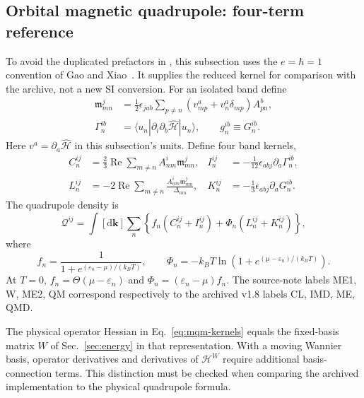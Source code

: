 \documentclass[prx,amsmath,amssymb,superscriptaddress,longbibliography]{revtex4-2}
\newcommand{\Rea}{\operatorname{Re}}
\newcommand{\dd}{\mathrm{d}}
\newcommand{\code}[1]{\texttt{\detokenize{#1}}}
\begin{document}
\subsection{Orbital magnetic quadrupole: four-term reference}
\label{sec:mqm}
To avoid the duplicated prefactors in \code{Wannier.tex}, this subsection
uses the $e=\hbar=1$ convention of Gao and Xiao~\cite{GaoXiao2018}.
It supplies the reduced kernel for comparison with the archive, not a new SI conversion.
For an isolated band define
\begin{align}
 \mathfrak m_{mn}^{j}
 &=\frac12\epsilon_{jab}\sum_{p\ne n}
       (v_{mp}^a+v_n^a\delta_{mp})A_{pn}^b,\label{eq:interband-moment}\\
 \Gamma_n^{i b}&=\langle u_n|\partial_i\partial_b\hat{\mathcal H}|u_n\rangle,
 \qquad g_n^{ib}\equiv G_n^{ib}.
\end{align}
Here $v^a=\partial_a\hat{\mathcal H}$ in this subsection's units.
Define four band kernels,
\begin{align}
 C_n^{ij}&=\frac23\Rea\sum_{m\ne n}A_{nm}^i\mathfrak m_{mn}^j,
 &I_n^{ij}&=-\frac1{12}\epsilon_{abj}\partial_a\Gamma_n^{ib},
 \nonumber\\
 L_n^{ij}&=-2\Rea\sum_{m\ne n}
                 \frac{A_{nm}^i\mathfrak m_{mn}^j}{\Delta_{nm}},
 &K_n^{ij}&=-\frac13\epsilon_{abj}\partial_aG_n^{ib}.
 \label{eq:mqm-kernels}
\end{align}
The quadrupole density is
\begin{equation}
 \mathcal Q^{ij}=\int[\dd\bm k]\sum_n
 \left\{f_n(C_n^{ij}+I_n^{ij})+\Phi_n(L_n^{ij}+K_n^{ij})\right\},
 \label{eq:mqm}
\end{equation}
where
\begin{equation}
 f_n=\frac1{1+e^{(\varepsilon_n-\mu)/(k_BT)}},\qquad
 \Phi_n=-k_BT\ln\left(1+e^{(\mu-\varepsilon_n)/(k_BT)}\right).
 \label{eq:grand-potential}
\end{equation}
At $T=0$, $f_n=\Theta(\mu-\varepsilon_n)$ and
$\Phi_n=(\varepsilon_n-\mu)f_n$.
The source-note labels ME1, W, ME2, QM correspond respectively to the
archived v1.8 labels CL, IMD, ME, QMD.

The physical operator Hessian in Eq.~\eqref{eq:mqm-kernels} equals the fixed-basis
matrix $W$ of Sec.~\ref{sec:energy} in that representation.
With a moving Wannier basis, operator derivatives and derivatives of
$\mathcal H^W$ require additional basis-connection terms.
This distinction must be checked when comparing the archived \code{DerWln}
implementation to the physical quadrupole formula.
\end{document}
